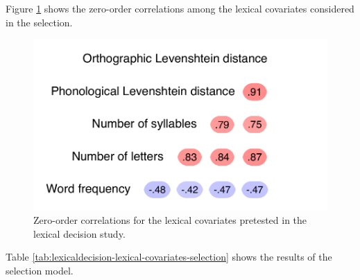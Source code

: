 \documentclass[
  12pt,
  man,floatsintext]{apa7}
\begin{document}
Figure \ref{fig:lexicaldecision-lexical-covariates-correlations} shows the zero-order correlations among the lexical covariates considered in the selection.

\begin{figure}

{\centering \includegraphics[width=0.5\linewidth]{manuscript_files/figure-latex/lexicaldecision-lexical-covariates-correlations-1} 

}

\caption{Zero-order correlations for the lexical covariates pretested in the lexical decision study.}\label{fig:lexicaldecision-lexical-covariates-correlations}
\end{figure}

Table \ref{tab:lexicaldecision-lexical-covariates-selection} shows the results of the selection model.
\end{document}

